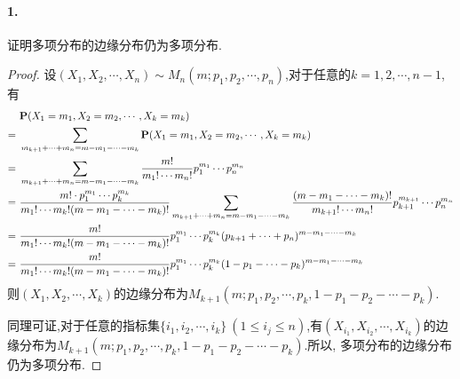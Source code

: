 \documentclass[12pt, a4paper, oneside]{ctexart}
\begin{document}
\paragraph{1.}证明多项分布的边缘分布仍为多项分布.
\begin{proof}
    设$(X_1,X_2,\cdots,X_n)\sim M_n(m; p_1,p_2,\cdots,p_n)$,对于任意的$k = 1,2,\cdots, n-1$,有
    \begin{equation*}
        \begin{aligned}
            &\ \P(X_1=m_1,X_2=m_2,\cdots,X_k=m_k)\\
            =&\ \sum_{m_{k+1}+\cdots+m_n=m-m_1-\cdots-m_k}\P(X_1 = m_1,X_2=m_2,\cdots,X_k = m_k)\\
            =&\ \sum_{m_{k+1}+\cdots+m_n=m-m_1-\cdots-m_k}\frac{m!}{m_1!\cdots m_n!}p_1^{m_1}\cdots p_n^{m_n}\\
            =&\ \frac{m!\cdot p_1^{m_1}\cdots p_k^{m_k}}{m_1!\cdots m_k!(m-m_1-\cdots-m_k)!}\sum_{m_{k+1}+\cdots+m_n=m-m_1-\cdots-m_k}\frac{(m-m_1-\cdots-m_k)!}{m_{k+1}!\cdots m_n!}p_{k+1}^{m_{k+1}}\cdots p_n^{m_n}\\
            =&\ \frac{m!}{m_1!\cdots m_k!(m-m_1-\cdots-m_k)!}p_1^{m_1}\cdots p_k^{m_k}(p_{k+1}+\cdots+p_n)^{m-m_1-\cdots-m_k}\\
            =&\ \frac{m!}{m_1!\cdots m_k!(m-m_1-\cdots-m_k)!}p_1^{m_1}\cdots p_k^{m_k}(1-p_1-\cdots-p_k)^{m-m_1-\cdots-m_k}\\
        \end{aligned}
    \end{equation*}
    则$(X_1,X_2,\cdots,X_k)$的边缘分布为$M_{k+1}(m;p_1,p_2,\cdots,p_k,1-p_1-p_2-\cdots-p_k)$.
    
    同理可证,对于任意的指标集$\{i_1,i_2,\cdots,i_k\}\ (1\leqslant i_j\leqslant n)$,有$(X_{i_1},X_{i_2},\cdots,X_{i_k})$的边缘分布为$M_{k+1}(m;p_1,p_2,\cdots,p_k,1-p_1-p_2-\cdots-p_k)$.所以, 多项分布的边缘分布仍为多项分布.
\end{proof}
\end{document}

